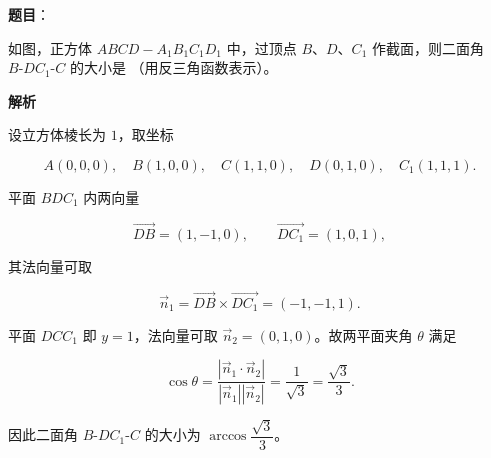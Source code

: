\begin{answer}

\textbf{题目}：

如图，正方体 $ABCD-A_1B_1C_1D_1$ 中，过顶点 $B$、$D$、$C_1$ 作截面，则二面角 $B\text{-}DC_1\text{-}C$ 的大小是 \gkblank{}（用反三角函数表示）。
\nopagebreak[4]
\begin{center}\end{center}
\nopagebreak[4]
\textbf{解析}

设立方体棱长为 $1$，取坐标

\nopagebreak[4]
\[
A(0,0,0),\quad B(1,0,0),\quad C(1,1,0),\quad D(0,1,0),\quad C_1(1,1,1).
\]

平面 $BDC_1$ 内两向量

\nopagebreak[4]
\[
\overrightarrow{DB}=(1,-1,0),\qquad \overrightarrow{DC_1}=(1,0,1),
\]

其法向量可取

\nopagebreak[4]
\[
\vec n_1=\overrightarrow{DB}\times\overrightarrow{DC_1}=(-1,-1,1).
\]

平面 $DCC_1$ 即 $y=1$，法向量可取 $\vec n_2=(0,1,0)$。故两平面夹角 $\theta$ 满足

\nopagebreak[4]
\[
\cos\theta=\frac{|\vec n_1\cdot\vec n_2|}{|\vec n_1||\vec n_2|}
=\frac{1}{\sqrt3}=\frac{\sqrt3}{3}.
\]

因此二面角 $B\text{-}DC_1\text{-}C$ 的大小为 $\arccos\dfrac{\sqrt3}{3}$。


\end{answer}


